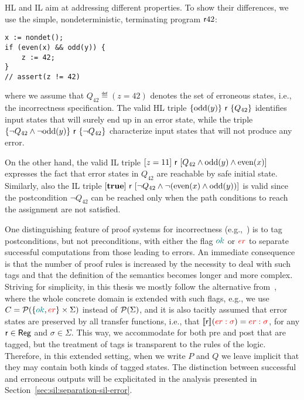 \begin{example}\label{ex:bg:il-hl-comparison}
	HL and IL aim at addressing different properties. To show their differences, we use the simple, nondeterministic, terminating program $\mathsf{r}{}42$:
	\begin{verbatim}
x := nondet();
if (even(x) && odd(y)) {
    z := 42;
}
// assert(z != 42)
	\end{verbatim}
	where we assume that $Q_{42} \eqdef (z = 42)$ denotes the set of erroneous states, i.e., the incorrectness specification.
	The valid HL triple $\{ \text{odd}(y) \}~\mathsf{r}~\{Q_{42}\}$ identifies input states that will surely end up in an  error state, while the triple $\{ \lnot Q_{42} \land \lnot \text{odd}(y)\}~\mathsf{r}~\{\lnot Q_{42}\}$ characterize input states that will not produce any error.

	On the other hand, the valid IL triple $[z = 11]~\mathsf{r}~[Q_{42} \land \text{odd}(y) \land \text{even}(x) ]$ expresses the fact that error states in $Q_{42}$ are reachable by safe initial state. Similarly, also the IL triple $[\textbf{true}]~\mathsf{r}~[\lnot Q_{42} \land \lnot (\text{even}(x) \land \text{odd}(y)) ]$ is valid since the postcondition $\lnot Q_{42}$ can be reached only when the path conditions to reach the assignment are not satisfied.
\end{example}

\begin{remark}[ok/er flags]\label{rem:bg:ok-er-flags}
	One distinguishing feature of proof systems for incorrectness (e.g.,~\cite{OHearn20,RBDDOV20,RBDO22,RVBO23}) is to tag postconditions, but not preconditions, with either the flag $\textcolor{teal}{ok}$ or $\textcolor{red}{er}$ to separate successful computations from those leading to errors.
	An immediate consequence is that the number of proof rules is increased by the necessity to deal with such tags and that the definition of the semantics becomes longer and more complex.
	Striving for simplicity, in this thesis we mostly follow the alternative from~\cite{BGGR23}, where the whole concrete domain is extended with such flags, e.g., we use $C = \mathcal{P}(\{\textcolor{teal}{ok},\textcolor{red}{er}\}\times \Sigma)$ instead of $\mathcal{P}(\Sigma)$, and it is also tacitly assumed that error states are preserved by all transfer functions, i.e., that $\llbracket\mathsf{r}\rrbracket (\textcolor{red}{er:\sigma}) = \textcolor{red}{er:\sigma}$, for any $\mathsf{r}\in\mathsf{Reg}$ and $\sigma\in\Sigma$.
	This way, we accommodate for both pre and post that are tagged, but the treatment of tags is transparent to the rules of the logic. Therefore, in this extended setting, when we write $P$ and $Q$ we leave implicit that they may contain both kinds of tagged states. The distinction between successful and erroneous outputs will be explicitated in the analysis presented in Section~\ref{sec:sil:separation-sil-error}.
\end{remark}

